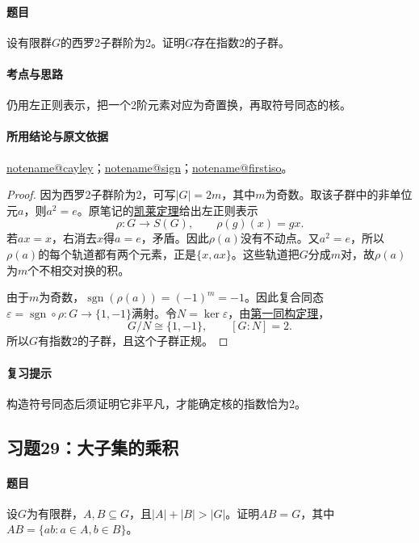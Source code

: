 \documentclass[UTF8,a4paper,11pt,fontset=windows]{ctexart}
\makeatletter
\DeclareMathOperator{\sgn}{sgn}\DeclareMathOperator{\Ker}{Ker}
\newcommand{\noteref}[1]{\hyperref[note:#1]{\csname notename@#1\endcsname}}
\newcommand{\proofref}[2]{\hyperref[note:#1]{#2}}
\newcommand{\exref}[2]{\hyperref[ex:#1:#2]{第#1章习题#2}}
\makeatother
\begin{document}
\paragraph{题目}
设有限群$G$的西罗2子群阶为2。证明$G$存在指数2的子群。

\paragraph{考点与思路}
仍用左正则表示，把一个2阶元素对应为奇置换，再取符号同态的核。

\paragraph{所用结论与原文依据}
\noteref{cayley}；\noteref{sign}；\noteref{firstiso}。


\begin{proof}
因为西罗2子群阶为2，可写$|G|=2m$，其中$m$为奇数。取该子群中的非单位元$a$，则$a^2=e$。原笔记的\proofref{cayley}{凯莱定理}给出左正则表示
\[
\rho:G\longrightarrow S(G),\qquad \rho(g)(x)=gx.
\]
若$ax=x$，右消去$x$得$a=e$，矛盾。因此$\rho(a)$没有不动点。又$a^2=e$，所以$\rho(a)$的每个轨道都有两个元素，正是$\{x,ax\}$。这些轨道把$G$分成$m$对，故$\rho(a)$为$m$个不相交对换的积。

由于$m$为奇数，$\sgn(\rho(a))=(-1)^m=-1$。因此复合同态$\varepsilon=\sgn\circ\rho:G\to\{1,-1\}$满射。令$N=\ker\varepsilon$，由\proofref{firstiso}{第一同构定理}，
\[
G/N\cong\{1,-1\},\qquad [G:N]=2.
\]
所以$G$有指数2的子群，且这个子群正规。
\end{proof}

\paragraph{复习提示}
构造符号同态后须证明它非平凡，才能确定核的指数恰为2。


\subsection{习题29：\texorpdfstring{大子集的乘积}{大子集的乘积}}
\label{ex:2:29}

\paragraph{题目}
设$G$为有限群，$A,B\subseteq G$，且$|A|+|B|>|G|$。证明$AB=G$，其中$AB=\{ab:a\in A,b\in B\}$。
\end{document}
